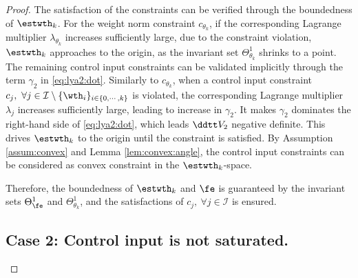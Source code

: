 \documentclass[journal]{IEEEtran}
\begin{document}
\begin{proof}
The satisfaction of the constraints can be verified through the boundedness of $\estwth_k$.
For the weight norm constraint $c_{\theta_k}$, if the corresponding Lagrange multiplier $\lambda_{\theta_k}$ increases sufficiently large, due to the constraint violation, $\estwth_k$ approaches to the origin, as the invariant set $\Theta_{\theta_k}^{1}$ shrinks to a point.
The remaining control input constraints can be validated implicitly through the term ${\gamma}_2$ in \eqref{eq:lya2:dot}.
Similarly to $c_{\theta_k}$, when a control input constraint $c_j,\ \forall j\in\mathcal{I}\setminus \{\wth_i\}_{i\in\{0,\cdots,k\}}$ is violated, the corresponding Lagrange multiplier $\lambda_j$ increases sufficiently large, leading to increase in ${\gamma}_2$.
It makes ${\gamma}_2$ dominates the right-hand side of \eqref{eq:lya2:dot}, which leads $\ddtt V_2$ negative definite.
This drives $\estwth_k$ to the origin until the constraint is satisfied.
By Assumption \ref{assum:convex} and Lemma \ref{lem:convex:angle}, the control input constraints can be considered as convex constraint in the $\estwth_k$-space.

Therefore, the boundedness of $\estwth_k$ and $\fe$ is guaranteed by the invariant sets $\Theta_{\fe}^{1}$ and $\Theta_{\theta_k}^{1}$, and the satisfactions of $c_j,\ \forall j\in\mathcal{I}$ is ensured.

\subsection*{Case 2: Control input is not saturated.}


\end{proof}
\end{document}
